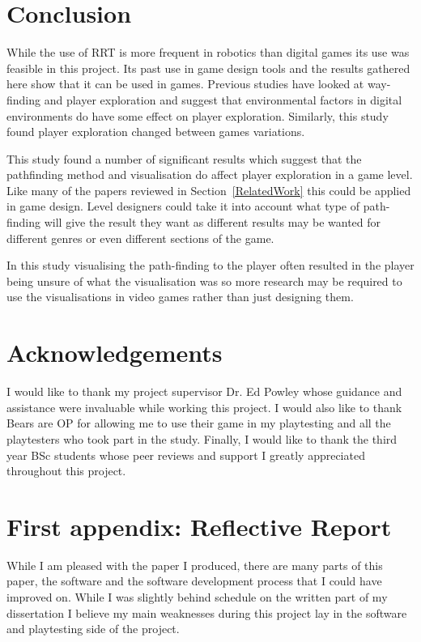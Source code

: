 \documentclass[journal]{IEEEtran}
\begin{document}
	
	\section{Conclusion} 
	While the use of RRT is more frequent in robotics than digital games its use was feasible in this project. Its past use in game design tools and the results gathered here show that it can be used in games. Previous studies have looked at way-finding and player exploration and suggest that environmental factors in digital environments do have some effect on player exploration.  Similarly, this study found player exploration changed between games variations. 
	
	This study found a number of significant results which suggest that the pathfinding method and visualisation do affect player exploration in a game level.  
	Like many of the papers reviewed in Section~\ref{RelatedWork} this could be applied in game design. Level designers could take it into account what type of path-finding will give the result they want as different results may be wanted for different genres or even different sections of the game. 
	
	In this study visualising the path-finding to the player often resulted in the player being unsure of what the visualisation was so more research may be required to use the visualisations in video games rather than just designing them.
	
	
	
	
	\appendices
	\section{Acknowledgements}
	I would like to thank my project supervisor Dr. Ed Powley whose guidance and assistance were invaluable while working this project.
	I would also like to thank Bears are OP for allowing me to use their game in my playtesting and all the playtesters who took part in the study.
	Finally, I would like to thank the third year BSc students whose peer reviews and support I greatly appreciated throughout this project. 
	
	\section{First appendix: Reflective Report}
	
	While I am pleased with the paper I produced, there are many parts of this paper, the software and the software development process that I could have improved on. While I was slightly behind schedule on the written part of my dissertation I believe my main weaknesses during this project lay in the software and playtesting side of the project.    
	
\end{document}
